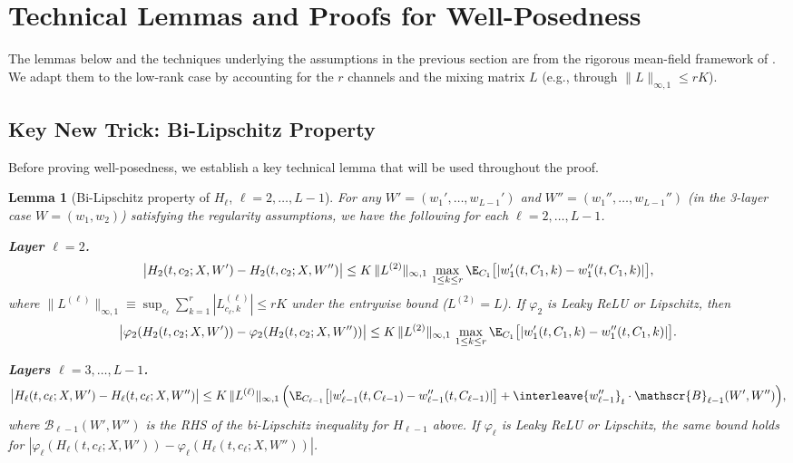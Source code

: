 \documentclass[nohyperref]{article}
\theoremstyle{plain}
\newtheorem{lemma}[theorem]{Lemma}
\theoremstyle{definition}
\theoremstyle{remark}
\begin{document}
\section{Technical Lemmas and Proofs for Well-Posedness}
\label{app:wellposed-proof}

The lemmas below and the techniques underlying the assumptions in the previous section are from the rigorous mean-field framework of \cite{nguyen2023rigorousframeworkmeanfield}. We adapt them to the low-rank case by accounting for the $r$ channels and the mixing matrix $L$ (e.g., through $\|L\|_{\infty,1}\le rK$).

\subsection{Key New Trick: Bi-Lipschitz Property}
\label{app:bilipschitz}

Before proving well-posedness, we establish a key technical lemma that will be used throughout the proof.

\begin{lemma}[Bi-Lipschitz property of $H_\ell$, $\ell=2,\ldots,L-1$]
\label{lem:bilipschitz-H2}
For any $W'=(w_1',\ldots,w_{L-1}')$ and $W''=(w_1'',\ldots,w_{L-1}'')$ (in the 3-layer case $W=(w_1,w_2)$) satisfying the regularity assumptions, we have the following for each $\ell=2,\ldots,L-1$.

\textbf{Layer $\ell=2$.}
\[
\big|H_2(t,c_2;X,W')-H_2(t,c_2;X,W'')\big| \le K\,\|L^{(2)}\|_{\infty,1}\,\max_{1\le k\le r}\E_{C_1}\big[|w_1'(t,C_1,k)-w_1''(t,C_1,k)|\big],
\]
where $\|L^{(\ell)}\|_{\infty,1}\equiv \sup_{c_\ell}\sum_{k=1}^r |L^{(\ell)}_{c_\ell,k}|\le rK$ under the entrywise bound ($L^{(2)}=L$). If $\varphi_2$ is Leaky ReLU or Lipschitz, then
\[
\big|\varphi_2(H_2(t,c_2;X,W'))-\varphi_2(H_2(t,c_2;X,W''))\big| \le K\,\|L^{(2)}\|_{\infty,1}\,\max_{1\le k\le r}\E_{C_1}\big[|w_1'(t,C_1,k)-w_1''(t,C_1,k)|\big].
\]

\textbf{Layers $\ell=3,\ldots,L-1$.}
\[
\big|H_\ell(t,c_\ell;X,W')-H_\ell(t,c_\ell;X,W'')\big| \le K\,\|L^{(\ell)}\|_{\infty,1}\,
\Big( \E_{C_{\ell-1}}\big[|w_{\ell-1}'(t,C_{\ell-1})-w_{\ell-1}''(t,C_{\ell-1})|\big]
+ {\interleave{w_{\ell-1}''}}_t \cdot \mathscr{B}_{\ell-1}(W',W'')\Big),
\]
where $\mathscr{B}_{\ell-1}(W',W'')$ is the RHS of the bi-Lipschitz inequality for $H_{\ell-1}$ above. If $\varphi_\ell$ is Leaky ReLU or Lipschitz, the same bound holds for $|\varphi_\ell(H_\ell(t,c_\ell;X,W'))-\varphi_\ell(H_\ell(t,c_\ell;X,W''))|$.
\end{lemma}
\end{document}
